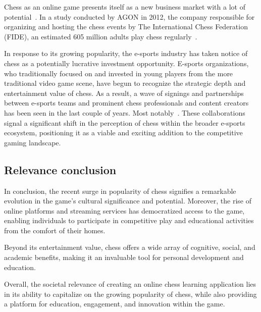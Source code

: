 Chess as an online game presents itself as a new business market with a lot of
potential~\cite{business-insider2021}.
In a study conducted by AGON in 2012, the company responsible for organizing and hosting the chess events by The
International Chess Federation (FIDE), an estimated 605 million adults play chess regularly~\cite{chessbase2012}.

In response to its growing popularity, the e-sports industry has taken notice of chess as a potentially lucrative
investment opportunity.
E-sports organizations, who traditionally focused on and invested in young players from the more traditional video game
scene, have begun to recognize the strategic depth and entertainment value of chess.
As a result, a wave of signings and partnerships between e-sports teams and prominent chess professionals and content
creators has been seen in the last couple of years.
Most notably~.
These collaborations signal a significant shift in the perception of chess within the broader e-sports ecosystem,
positioning it as a viable and exciting addition to the competitive gaming landscape.

\subsection{Relevance conclusion}\label{subsec:relevance-conclusion}

In conclusion, the recent surge in popularity of chess signifies a remarkable evolution in the game's cultural
significance and potential.
Moreover, the rise of online platforms and streaming services has democratized access to the game, enabling individuals
to participate in competitive play and educational activities from the comfort of their homes.

Beyond its entertainment value, chess offers a wide array of cognitive, social, and academic benefits, making it an
invaluable tool for personal development and education.

Overall, the societal relevance of creating an online chess learning application lies in its ability to capitalize on
the growing popularity of chess, while also providing a platform for education, engagement, and innovation within the
game.
